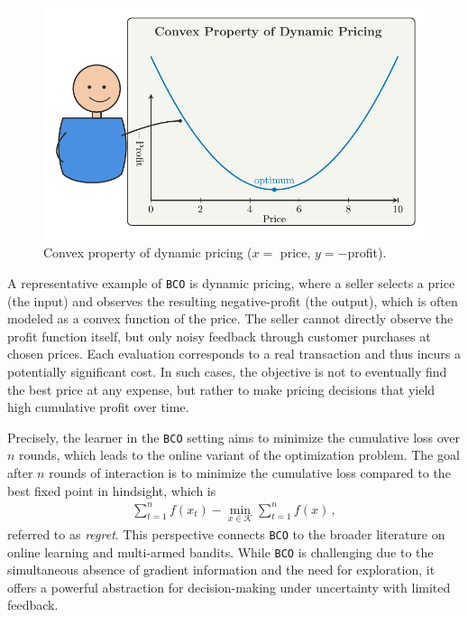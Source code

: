 \documentclass[letter, 12pt]{report}
\newcommand{\cK}{\mathcal K}
\newcommand{\1}{\mathbf{1}}
\newcommand{\bco}{\texttt{BCO}\xspace}
\theoremstyle{plain}
\theoremstyle{definition}
\theoremstyle{remark}
\begin{document}
\begin{figure} %
    \vspace{-8pt}                           %
    \centering
    \includegraphics[width=\linewidth]{figures/dprice.pdf}
    \caption{Convex property of dynamic pricing (\(x=\) price, \(y=-\)profit).}
    \vspace{-6pt}                           %
\end{figure}
A representative example of \bco is dynamic pricing, where a seller selects a price (the input) and observes the resulting negative-profit (the output), which is often modeled as a convex function of the price.
The seller cannot directly observe the profit function itself, but only noisy feedback through customer purchases at chosen prices. Each evaluation corresponds to a real transaction and thus incurs a potentially significant cost. In such cases, the objective is not to eventually find the best price at any expense, but rather to make pricing decisions that yield high cumulative profit over time.

Precisely, the learner in the \bco setting aims to minimize the cumulative loss over \( n \) rounds,
which leads to the online variant of the optimization problem.
The goal after $n$ rounds of interaction is to minimize the cumulative loss compared to the best fixed point in hindsight,
which is
\begin{align}
    \sum_{t=1}^n f(x_t) - \min_{x \in \cK} \sum_{t=1}^n f(x)\,,
\end{align}
referred to as \emph{regret}. This perspective connects \bco to the broader literature on online learning and multi-armed bandits. While \bco is challenging due to the simultaneous absence of gradient information and the need for exploration, it offers a powerful abstraction for decision-making under uncertainty with limited feedback.
\end{document}
